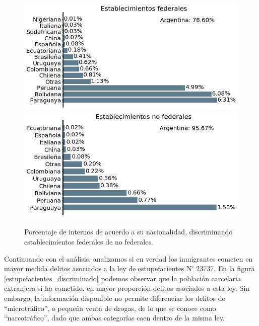 \documentclass[10pt]{article}
\begin{document}
\begin{figure}[H]
	\centering
\includegraphics[scale=0.31]{graficos/nacionalidad_bar_federales.png}
\includegraphics[scale=0.31]{graficos/nacionalidad_bar_no_federales.png}
	\caption{Porcentaje de internos de acuerdo a su nacionalidad, discriminando establecimientos federales de no federales.\label{nacionalidad_discriminado}}
\end{figure}

Continuando con el an\'alisis, analizamos si en verdad los inmigrantes cometen en mayor medida delitos asociados a la ley de estupefacientes $\mathrm{N}^{\circ}\; 23737$. En la figura \ref{estupefacientes_discriminado} podemos observar que la poblaci\'on carcelaria extranjera s\'i ha cometido, en mayor proporci\'on delitos asociados a esta ley. Sin embargo, la informaci\'on disponible no permite diferenciar los delitos de ``microtr\'afico'', o peque\~na venta de drogas, de lo que se conoce como ``narcotr\'afico'', dado que ambas categor\'ias caen dentro de la misma ley. 
\end{document}
